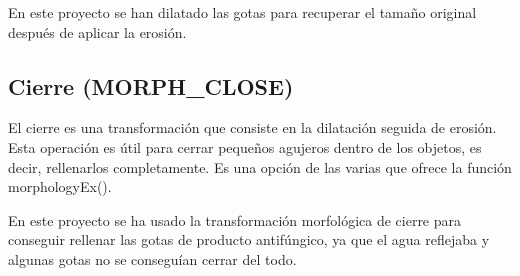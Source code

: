 
En este proyecto se han dilatado las gotas para recuperar el tamaño original después de aplicar la erosión.

\subsection{Cierre (MORPH\_CLOSE)}
El cierre es una transformación que consiste en la dilatación seguida de erosión. Esta operación es útil para cerrar pequeños agujeros dentro de los objetos, es decir, rellenarlos completamente. Es una opción de las varias que ofrece la función morphologyEx().


En este proyecto se ha usado la transformación morfológica de cierre para conseguir rellenar las gotas de producto antifúngico, ya que el agua reflejaba y algunas gotas no se conseguían cerrar del todo.